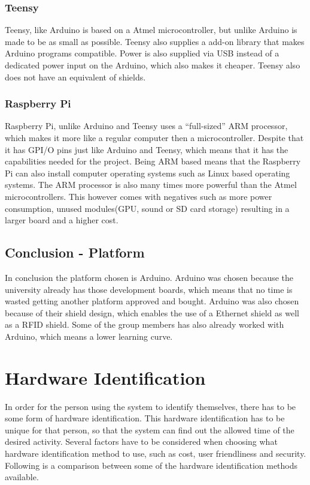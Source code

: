 \subsubsection{Teensy}
Teensy, like Arduino is based on a Atmel microcontroller, but unlike Arduino is made to be as small as possible. Teensy also supplies a add-on library that makes Arduino programs compatible. Power is also supplied via USB instead of a dedicated power input on the Arduino, which also makes it cheaper. Teensy also does not have an equivalent of shields.


\subsubsection{Raspberry Pi}
Raspberry Pi, unlike Arduino and Teensy uses a ``full-sized'' ARM processor, which makes it more like a regular computer then a microcontroller. Despite that it has GPI/O pins just like Arduino and Teensy, which means that it has the capabilities needed for the project. Being ARM based means that the Raspberry Pi can also install computer operating systems such as Linux based operating systems. The ARM processor is also many times more powerful than the Atmel microcontrollers. This however comes with negatives such as more power consumption, unused modules(GPU, sound or SD card storage) resulting in a larger board and a higher cost. 

\subsection{Conclusion - Platform}
In conclusion the platform chosen is Arduino. Arduino was chosen because the university already has those development boards, which means that no time is wasted getting another platform approved and bought. Arduino was also chosen because of their shield design, which enables the use of a Ethernet shield as well as a RFID shield. Some of the group members has also already worked with Arduino, which means a lower learning curve.

\section{Hardware Identification}
In order for the person using the system to identify themselves, there has to be some form of hardware identification. This hardware identification has to be unique for that person, so that the system can find out the allowed time of the desired activity. Several factors have to be considered when choosing what hardware identification method to use, such as cost, user friendliness and security. Following is a comparison between some of the hardware identification methods available.

